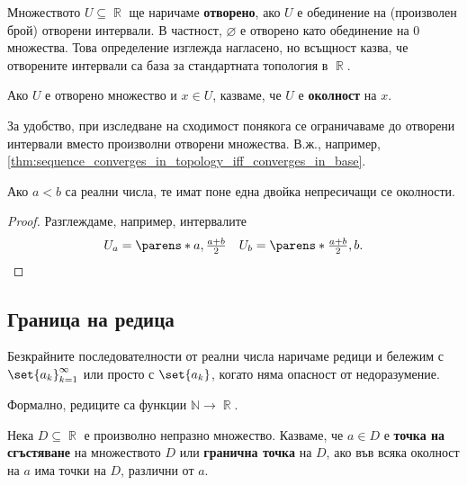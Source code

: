 \documentclass{../../common/topic}
\begin{document}
\begin{definition}
  Множеството \( U \subseteq \BbbR \) ще наричаме \textbf{отворено}, ако \( U \) е обединение на (произволен брой) отворени интервали. В частност, \( \varnothing \) е отворено като обединение на \( 0 \) множества. Това определение изглежда нагласено, но всъщност казва, че отворените интервали са база за стандартната топология в \( \BbbR \).

  Ако \( U \) е отворено множество и \( x \in U \), казваме, че \( U \) е \textbf{околност} на \( x \).
\end{definition}

За удобство, при изследване на сходимост понякога се ограничаваме до отворени интервали вместо произволни отворени множества. В.ж., например, \cref{thm:sequence_converges_in_topology_iff_converges_in_base}.

\begin{lemma}\label{thm:real_numbers_are_hausdorff}
  Ако \( a < b \) са реални числа, те имат поне една двойка непресичащи се околности.
\end{lemma}
\begin{proof}
  Разглеждаме, например, интервалите
  \begin{align*}
    U_a = \parens*{a, \tfrac {a + b} 2 } && U_b = \parens*{\tfrac {a + b} 2, b}.
  \end{align*}
\end{proof}

\subsection{Граница на редица}

\begin{definition}
  Безкрайните последователности от реални числа наричаме редици и бележим с \( {\set{ a_k }}_{k=1}^\infty \) или просто с \( \set{ a_k } \), когато няма опасност от недоразумение.

  Формално, редиците са функции \( \mathbb{N} \to \BbbR \).
\end{definition}

\begin{definition}
  Нека \( D \subseteq \BbbR \) е произволно непразно множество. Казваме, че \( a \in D \) е \textbf{точка на сгъстяване} на множеството \( D \) или \textbf{гранична точка} на \( D \), ако във всяка околност на \( a \) има точки на \( D \), различни от \( a \).
\end{definition}
\end{document}
